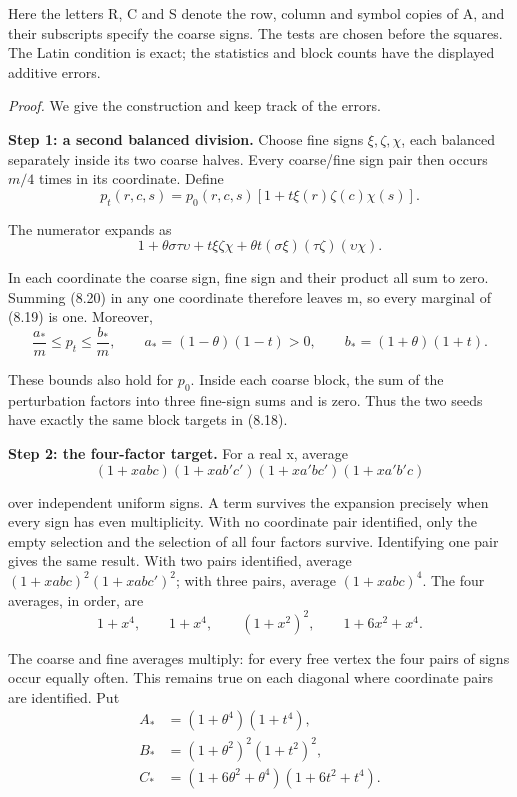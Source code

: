 \documentclass[english,11pt,a4paper]{article}
\begin{document}
Here the letters R, C and S denote the row, column and symbol copies of A, and their subscripts specify the coarse signs. The tests are chosen before the squares. The Latin condition is exact; the statistics and block counts have the displayed additive errors.

\emph{Proof.} We give the construction and keep track of the errors.

\textbf{Step 1: a second balanced division.} Choose fine signs \(\xi,\zeta,\chi\), each balanced separately inside its two coarse halves. Every coarse/fine sign pair then occurs \(m/4\) times in its coordinate. Define
\[p_t(r,c,s)=p_0(r,c,s)[1+t\xi(r)\zeta(c)\chi(s)].              \tag{8.19}\]

The numerator expands as
\[1+\theta\sigma\tau\upsilon+t\xi\zeta\chi
  +\theta t(\sigma\xi)(\tau\zeta)(\upsilon\chi).              \tag{8.20}\]

In each coordinate the coarse sign, fine sign and their product all sum to zero. Summing (8.20) in any one coordinate therefore leaves m, so every marginal of (8.19) is one. Moreover,
\[\frac{a_*}{m}\leq p_t\leq\frac{b_*}{m},\qquad
a_*=(1-\theta)(1-t)>0,\qquad b_*=(1+\theta)(1+t).             \tag{8.21}\]

These bounds also hold for \(p_0\). Inside each coarse block, the sum of the perturbation factors into three fine-sign sums and is zero. Thus the two seeds have exactly the same block targets in (8.18).

\textbf{Step 2: the four-factor target.} For a real x, average
\[(1+xabc)(1+xab'c')(1+xa'bc')(1+xa'b'c)\]

over independent uniform signs. A term survives the expansion precisely when every sign has even multiplicity. With no coordinate pair identified, only the empty selection and the selection of all four factors survive. Identifying one pair gives the same result. With two pairs identified, average \((1+xabc)^2(1+xabc')^2\); with three pairs, average \((1+xabc)^4\). The four averages, in order, are
\[1+x^4,\qquad 1+x^4,\qquad (1+x^2)^2,\qquad 1+6x^2+x^4.     \tag{8.22}\]

The coarse and fine averages multiply: for every free vertex the four pairs of signs occur equally often. This remains true on each diagonal where coordinate pairs are identified. Put
\[\begin{aligned}
A_*&=(1+\theta^4)(1+t^4),\\
B_*&=(1+\theta^2)^2(1+t^2)^2,\\
C_*&=(1+6\theta^2+\theta^4)(1+6t^2+t^4).
\end{aligned}\]
\end{document}
